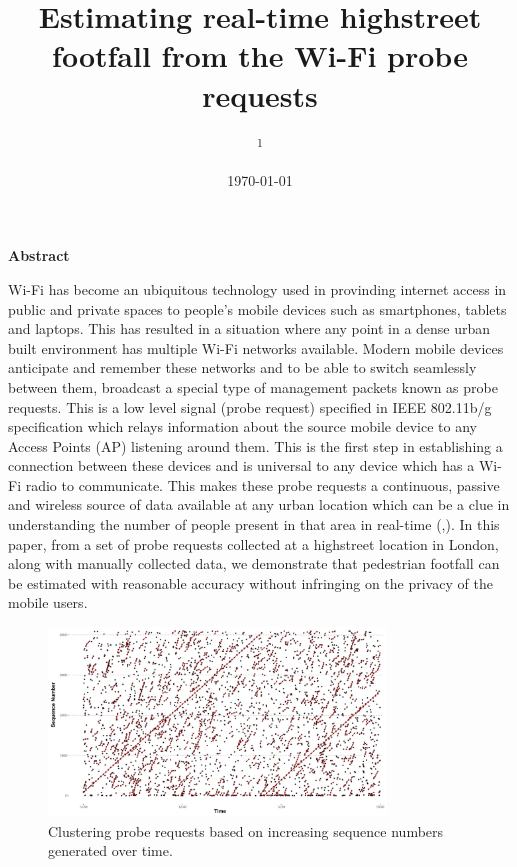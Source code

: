 \documentclass[11t, a4paper, twocolumn]{article}
\title{Estimating real-time highstreet footfall from the Wi-Fi probe requests}
\author{
	\authorstyle{
		Balamurugan Soundararaj\textsuperscript{1}, 
		James Cheshire\textsuperscript{1} and 
		Paul Longley\textsuperscript{1}}
	\newline\newline
	\textsuperscript{1}\institution{
		Department of Geography, 
		University College London, 
		United Kingdom}
}
\date{\today}
\begin{document}

	\maketitle
	\thispagestyle{firstpage}

	\textbf{Abstract}

	Wi-Fi has become an ubiquitous technology used in provinding internet access in
	public and private spaces to people's mobile devices such as smartphones, 
	tablets and laptops. This has resulted in a situation
	where any point in a dense urban built environment 
	has multiple Wi-Fi networks available. Modern mobile devices anticipate and 
	remember these networks and to be able to switch seamlessly between them,
	broadcast a special type of management packets known as probe requests.
	This is a low level signal (probe request) specified in IEEE 802.11b/g specification
	which relays information about the source mobile device to
	any Access Points (AP) listening around them.
	This is the first step in establishing a connection between these devices and
	is universal to any device which has a Wi-Fi radio to communicate.
	This makes these probe requests a continuous, passive and wireless source of
	data available at any urban location which can be a clue in
	understanding the number of people present in that area in real-time (\citep{freud2015},\citep{konto2017}).
	In this paper, from a set of probe requests collected
	at a highstreet location in London, along with manually collected data, we demonstrate
	that pedestrian footfall can be estimated with reasonable accuracy without
	infringing on the privacy of the mobile users.

	\begin{figure}
		\begin{center}
	  \includegraphics[width=0.8\textwidth]{outputs/clustering_1.png}
	  \caption{Clustering probe requests based on increasing sequence numbers generated over time.}
		\end{center}
	\end{figure}
\end{document}
